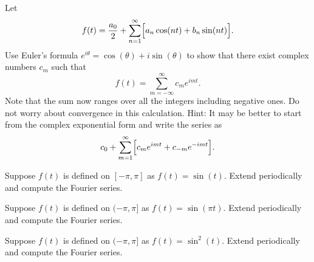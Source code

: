 \begin{exercise}
\begin{samepage}
Let 
\begin{equation*}
f(t) = \frac{a_0}{2} + \sum_{n=1}^\infty
\Bigl[ a_n \cos (n t) + b_n \sin (n t) \Bigr] .
\end{equation*}
Use Euler's formula $e^{i\theta} = \cos (\theta) + i \sin (\theta)$ to
show that there exist complex numbers $c_m$ such that
\begin{equation*}
f(t) = 
\sum_{m=-\infty}^\infty c_m e^{imt} .
\end{equation*}
Note that the sum now ranges over all the integers including negative ones.
Do not worry about convergence in this calculation.
Hint: It may be better to start from the complex exponential form and write
the series as
\begin{equation*}
c_0 + \sum_{m=1}^\infty \Bigl[ c_m e^{imt} + c_{-m} e^{-imt} \Bigr] .
\end{equation*}
\end{samepage}
\end{exercise}

\setcounter{exercise}{100}

\begin{exercise}
Suppose $f(t)$ is defined on $[-\pi,\pi]$ as $f(t) = \sin(t)$.  Extend
periodically and compute the Fourier series.
\end{exercise}

\begin{exercise}
Suppose $f(t)$ is defined on $(-\pi,\pi]$ as $f(t) = \sin(\pi t)$.  Extend
periodically and compute the Fourier series.
\end{exercise}

\begin{exercise}
Suppose $f(t)$ is defined on $(-\pi,\pi]$ as $f(t) = \sin^2(t)$.
Extend
periodically and compute the Fourier series.
\end{exercise}

